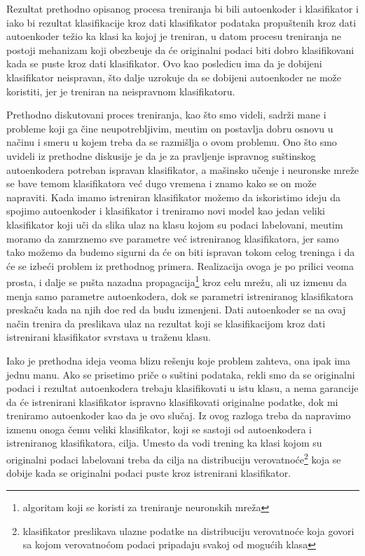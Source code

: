 \documentclass{article}
\begin{document}
	Rezultat prethodno opisanog procesa treniranja bi bili autoenkoder i klasifikator i iako bi rezultat klasifikacije kroz dati klasifikator podataka propu\v stenih kroz dati autoenkoder te\v zio ka klasi ka kojoj je treniran, u datom procesu treniranja ne postoji mehanizam koji obezbe\dj uje da \'ce originalni podaci biti dobro klasifikovani kada se puste kroz dati klasifikator.
	Ovo kao posledicu ima da je dobijeni klasifikator neispravan, \v sto dalje uzrokuje da se dobijeni autoenkoder ne mo\v ze koristiti, jer je treniran na neispravnom klasifikatoru.
	
	Prethodno diskutovani proces treniranja, kao \v sto smo videli, sadr\v zi mane i probleme koji ga \v cine neupotrebljivim, me\dj utim on postavlja dobru osnovu u na\v cinu i smeru u kojem treba da se razmi\v slja o ovom problemu.
	Ono \v sto smo uvideli iz prethodne diskusije je da je za pravljenje ispravnog su\v stinskog autoenkodera potreban ispravan klasifikator, a ma\v sinsko u\v cenje i neuronske mre\v ze se bave temom klasifikatora ve\'c dugo vremena i znamo kako se on mo\v ze napraviti.
	Kada imamo istreniran klasifikator mo\v zemo da iskoristimo ideju da spojimo autoenkoder i klasifikator i treniramo novi model kao jedan veliki klasifikator koji u\v ci da slika ulaz na klasu kojom su podaci labelovani, me\dj utim moramo da zamrznemo sve parametre ve\'c istreniranog klasifikatora, jer samo tako mo\v zemo da budemo sigurni da \'ce on biti ispravan tokom celog treninga i da \'ce se izbe\'ci problem iz prethodnog primera.
	Realizacija ovoga je po prilici veoma prosta, i dalje se pu\v sta nazadna propagacija\footnote{algoritam koji se koristi za treniranje neuronskih mre\v za} kroz celu mre\v zu, ali uz izmenu da menja samo parametre autoenkodera, dok se parametri istreniranog klasifikatora preska\v cu kada na njih do\dj e red da budu izmenjeni.
	Dati autoenkoder se na ovaj na\v cin trenira da preslikava ulaz na rezultat koji se klasifikacijom kroz dati istrenirani klasifikator svrstava u tra\v zenu klasu.
	
	Iako je prethodna ideja veoma blizu re\v senju koje problem zahteva, ona ipak ima jednu manu. 
	Ako se prisetimo pri\v ce o su\v stini podataka, rekli smo da se originalni podaci i rezultat autoenkodera trebaju klasifikovati u istu klasu, a nema garancije da \'ce istrenirani klasifikator ispravno klasifikovati originalne podatke, dok mi treniramo autoenkoder kao da je ovo slu\v caj.
	Iz ovog razloga treba da napravimo izmenu onoga \v cemu veliki klasifikator, koji se sastoji od autoenkodera i istreniranog klasifikatora, cilja.
	Umesto da vodi trening ka klasi kojom su originalni podaci labelovani treba da cilja na distribuciju verovatno\'ce\footnote{klasifikator preslikava ulazne podatke na distribuciju verovatno\'ce koja govori sa kojom verovatno\'com podaci pripadaju svakoj od mogu\'cih klasa} koja se dobije kada se originalni podaci puste kroz istrenirani klasifikator.
	
\end{document}

